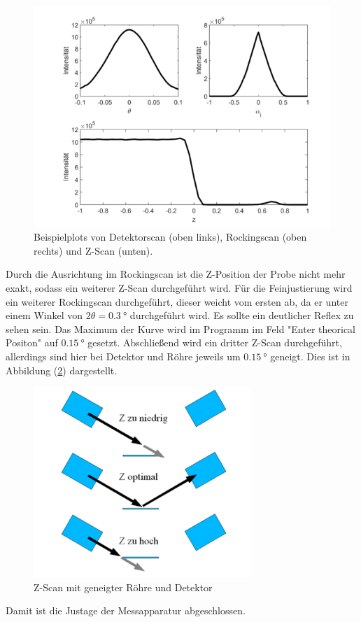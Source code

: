 \begin{figure}[h!]
  \centering
  \includegraphics[scale=0.7]{fig/beispiel.png}
  \caption{Beispielplots von Detektorscan (oben links), Rockingscan (oben rechts) und Z-Scan (unten). \cite[6]{Anleitung4}}
  \label{fig:beispiele}
\end{figure}
\FloatBarrier
\noindent Durch die Ausrichtung im Rockingscan ist die Z-Position der Probe nicht mehr exakt, sodass ein weiterer Z-Scan durchgeführt wird. Für die Feinjustierung wird ein weiterer Rockingscan durchgeführt, dieser weicht vom ersten ab, da er unter einem Winkel von $2\theta=\SI{0.3}{\degree}$ durchgeführt wird. Es sollte ein deutlicher Reflex zu sehen sein.  Das Maximum der Kurve wird im Programm im Feld "Enter theorical Positon" auf $\SI{0.15}{\degree}$ gesetzt. Abschließend wird ein dritter Z-Scan durchgeführt, allerdings sind hier bei Detektor und Röhre jeweils um $\SI{0.15}{\degree}$ geneigt. Dies ist in Abbildung (\ref{fig:zscan015}) dargestellt.
\begin{figure}[h!]
  \centering
  \includegraphics[scale=1]{fig/zscan015.png}
  \caption{Z-Scan mit geneigter Röhre und Detektor \cite[7]{Anleitung4}}
  \label{fig:zscan015}
\end{figure}
\FloatBarrier
\noindent Damit ist die Justage der Messapparatur abgeschlossen.
